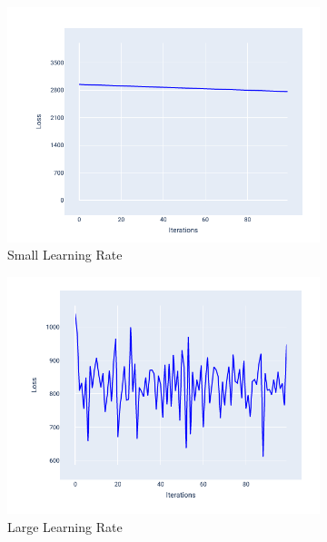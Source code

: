 \documentclass[a4paper,12pt]{article}
\begin{document}
\begin{figure}[H]
    \centering
    \begin{subfigure}[b]{0.45\textwidth}
        \centering
        \includegraphics[width=\textwidth]{../Images/Linear-Regression/small-lr.png}
        \caption{Small Learning Rate}
        \label{fig:small-lr}
    \end{subfigure}
    \hfill
    \begin{subfigure}[b]{0.45\textwidth}
        \centering
        \includegraphics[width=\textwidth]{../Images/Linear-Regression/high-lr.png}
        \caption{Large Learning Rate}
        \label{fig:large-lr}
    \end{subfigure}
    \begin{subfigure}[c]{0.45\textwidth}

\end{subfigure}
\end{figure}
\end{document}
